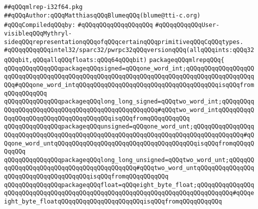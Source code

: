 \label{src/lib/c-glue-lib/ram/mlrep-i32f64.pkg}
\verb|##qQQqmlrep-i32f64.pkg|\newline
\verb|##qQQqAuthor:qQQqMatthiasqQQqBlumeqQQq(blume@tti-c.org)|\newline
\newline
\verb|#qQQqCompiledqQQqby:|\newline
\verb|#qQQqqQQqqQQqqQQqqQQq|\newline
\newline
\verb|#qQQqqQQqqQQqUser-visibleqQQqMythryl-sideqQQqrepresentationqQQqofqQQqcertainqQQqprimitiveqQQqCqQQqtypes.|\newline
\verb|#qQQqqQQqqQQqintel32/sparc32/pwrpc32qQQqversionqQQq(allqQQqints:qQQq32qQQqbit,qQQqallqQQqfloats:qQQq64qQQqbit)|\newline
\newline
\newline
\verb|packageqQQqmlrepqQQq{|\newline
\newline
\verb|qQQqqQQqqQQqqQQqpackageqQQqsigned=qQQqone_word_int;qQQqqQQqqQQqqQQqqQQqqQQqqQQqqQQqqQQqqQQqqQQqqQQqqQQqqQQqqQQqqQQqqQQqqQQqqQQqqQQqqQQqqQQqqQQq#qQQqone_word_intqQQqqQQqqQQqqQQqqQQqqQQqqQQqqQQqqQQqqQQqisqQQqfromqQQqqQQqqQQq|\newline
\verb|qQQqqQQqqQQqqQQqpackageqQQqlong_long_signed=qQQqtwo_word_int;qQQqqQQqqQQqqQQqqQQqqQQqqQQqqQQqqQQqqQQqqQQqqQQqqQQq#qQQqtwo_word_intqQQqqQQqqQQqqQQqqQQqqQQqqQQqqQQqqQQqqQQqisqQQqfromqQQqqQQqqQQq|\newline
\verb|qQQqqQQqqQQqqQQqpackageqQQqunsigned=qQQqone_word_unt;qQQqqQQqqQQqqQQqqQQqqQQqqQQqqQQqqQQqqQQqqQQqqQQqqQQqqQQqqQQqqQQqqQQqqQQqqQQqqQQqqQQq#qQQqone_word_untqQQqqQQqqQQqqQQqqQQqqQQqqQQqqQQqqQQqqQQqisqQQqfromqQQqqQQqqQQq|\newline
\verb|qQQqqQQqqQQqqQQqpackageqQQqlong_long_unsigned=qQQqtwo_word_unt;qQQqqQQqqQQqqQQqqQQqqQQqqQQqqQQqqQQqqQQqqQQq#qQQqtwo_word_untqQQqqQQqqQQqqQQqqQQqqQQqqQQqqQQqqQQqqQQqisqQQqfromqQQqqQQqqQQq|\newline
\verb|qQQqqQQqqQQqqQQqpackageqQQqfloat=qQQqeight_byte_float;qQQqqQQqqQQqqQQqqQQqqQQqqQQqqQQqqQQqqQQqqQQqqQQqqQQqqQQqqQQqqQQqqQQqqQQqqQQqqQQq#qQQqeight_byte_floatqQQqqQQqqQQqqQQqqQQqqQQqisqQQqfromqQQqqQQqqQQq|\newline
